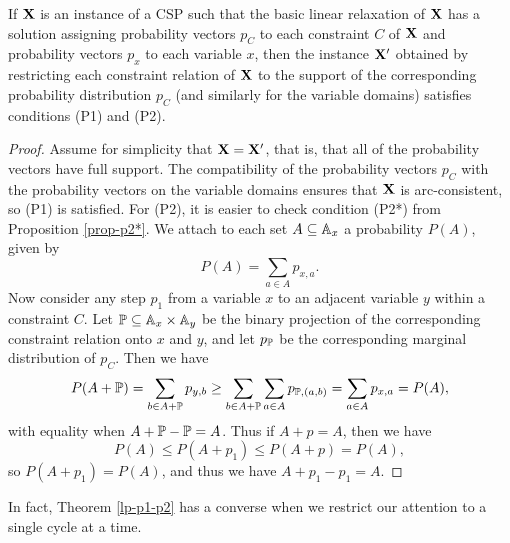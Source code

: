 \documentclass[letterpaper,11pt]{article}
\begin{document}
\begin{thm}\label{lp-p1-p2} If $\mathbf{X}$ is an instance of a CSP such that the basic linear relaxation of $\mathbf{X}$ has a solution assigning probability vectors $p_C$ to each constraint $C$ of $\mathbf{X}$ and probability vectors $p_x$ to each variable $x$, then the instance $\mathbf{X}'$ obtained by restricting each constraint relation of $\mathbf{X}$ to the support of the corresponding probability distribution $p_C$ (and similarly for the variable domains) satisfies conditions (P1) and (P2).
\end{thm}
\begin{proof} Assume for simplicity that $\mathbf{X} = \mathbf{X}'$, that is, that all of the probability vectors have full support. The compatibility of the probability vectors $p_C$ with the probability vectors on the variable domains ensures that $\mathbf{X}$ is arc-consistent, so (P1) is satisfied. For (P2), it is easier to check condition (P2*) from Proposition \ref{prop-p2*}. We attach to each set $A \subseteq \mathbb{A}_x$ a probability $P(A)$, given by
\[
P(A) = \sum_{a \in A} p_{x,a}.
\]
Now consider any step $p_1$ from a variable $x$ to an adjacent variable $y$ within a constraint $C$. Let $\mathbb{P} \subseteq \mathbb{A}_x \times \mathbb{A}_y$ be the binary projection of the corresponding constraint relation onto $x$ and $y$, and let $p_{\mathbb{P}}$ be the corresponding marginal distribution of $p_C$. Then we have
\[
P(A + \mathbb{P}) = \sum_{b \in A+\mathbb{P}} p_{y,b} \ge \sum_{b \in A+\mathbb{P}} \sum_{a \in A} p_{\mathbb{P},(a,b)} = \sum_{a \in A} p_{x,a} = P(A),
\]
with equality when $A + \mathbb{P} - \mathbb{P} = A$. Thus if $A + p = A$, then we have
\[
P(A) \le P(A+p_1) \le P(A+p) = P(A),
\]
so $P(A+p_1) = P(A)$, and thus we have $A + p_1 - p_1 = A$.
\end{proof}

In fact, Theorem \ref{lp-p1-p2} has a converse when we restrict our attention to a single cycle at a time.
\end{document}
